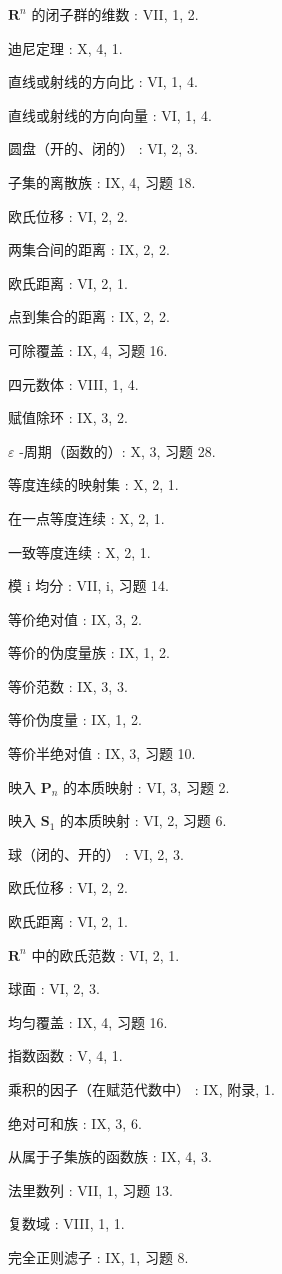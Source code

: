 \(\mathbf{R}^n\) 的闭子群的维数 : VII, 1, 2.

迪尼定理 : X, 4, 1.

直线或射线的方向比 : VI, 1, 4.

直线或射线的方向向量 : VI, 1, 4.

圆盘（开的、闭的） : VI, 2, 3.

子集的离散族 : IX, 4, 习题 18.

欧氏位移 : VI, 2, 2.

两集合间的距离 : IX, 2, 2.

欧氏距离 : VI, 2, 1.

点到集合的距离 : IX, 2, 2.

可除覆盖 : IX, 4, 习题 16.

四元数体 : VIII, 1, 4.

赋值除环 : IX, 3, 2.

\(\varepsilon\) -周期（函数的）: X, 3, 习题 28.

等度连续的映射集 : X, 2, 1.

在一点等度连续 : X, 2, 1.

一致等度连续 : X, 2, 1.

模 i 均分 : VII, i, 习题 14.

等价绝对值 : IX, 3, 2.

等价的伪度量族 : IX, 1, 2.

等价范数 : IX, 3, 3.

等价伪度量 : IX, 1, 2.

等价半绝对值 : IX, 3, 习题 10.

映入 \(\mathbf{P}_n\) 的本质映射 : VI, 3, 习题 2.

映入 \(\mathbf{S}_1\) 的本质映射 : VI, 2, 习题 6.

球（闭的、开的） : VI, 2, 3.

欧氏位移 : VI, 2, 2.

欧氏距离 : VI, 2, 1.

\(\mathbf{R}^n\) 中的欧氏范数 : VI, 2, 1.

球面 : VI, 2, 3.

均匀覆盖 : IX, 4, 习题 16.

指数函数 : V, 4, 1.

乘积的因子（在赋范代数中） : IX, 附录, 1.

绝对可和族 : IX, 3, 6.

从属于子集族的函数族 : IX, 4, 3.

法里数列 : VII, 1, 习题 13.

复数域 : VIII, 1, 1.

完全正则滤子 : IX, 1, 习题 8.

